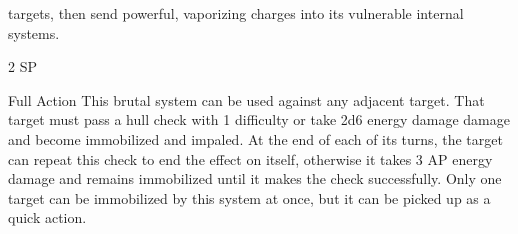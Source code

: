 targets, then send powerful, vaporizing charges into its vulnerable internal systems.

2 SP


Full Action
This brutal system can be used against any adjacent target. That target must pass a hull check
with 1 difficulty or take 2d6 energy damage damage and become immobilized and impaled. At
the end of each of its turns, the target can repeat this check to end the effect on itself, otherwise
it takes 3 AP energy damage and remains immobilized until it makes the check successfully. Only
one target can be immobilized by this system at once, but it can be picked up as a quick action.



